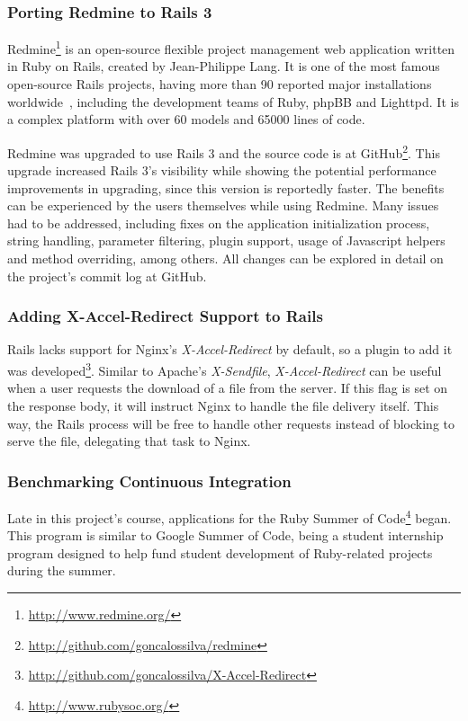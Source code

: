 \subsubsection{Porting Redmine to Rails 3}
Redmine\footnote{\url{http://www.redmine.org/}} is an open-source flexible project management web application written in Ruby on Rails, created by Jean-Philippe Lang. It is one of the most famous open-source Rails projects, having more than 90 reported major installations worldwide~\cite{redmine_installations}, including the development teams of Ruby, phpBB and Lighttpd. It is a complex platform with over 60 models and 65000 lines of code.

Redmine was upgraded to use Rails 3 and the source code is at GitHub\footnote{\url{http://github.com/goncalossilva/redmine}}. This upgrade increased Rails 3's visibility while showing the potential performance improvements in upgrading, since this version is reportedly faster. The benefits can be experienced by the users themselves while using Redmine. Many issues had to be addressed, including fixes on the application initialization process, string handling, parameter filtering, plugin support, usage of Javascript helpers and method overriding, among others. All changes can be explored in detail on the project's commit log at GitHub.


\subsubsection{Adding X-Accel-Redirect Support to Rails}
Rails lacks support for Nginx's \textit{X-Accel-Redirect} by default, so a plugin to add it was developed\footnote{\url{http://github.com/goncalossilva/X-Accel-Redirect}}. Similar to Apache's \textit{X-Sendfile}, \textit{X-Accel-Redirect} can be useful when a user requests the download of a file from the server. If this flag is set on the response body, it will instruct Nginx to handle the file delivery itself. This way, the Rails process will be free to handle other requests instead of blocking to serve the file, delegating that task to Nginx.


\subsubsection{Benchmarking Continuous Integration}
Late in this project's course, applications for the Ruby Summer of Code\footnote{\url{http://www.rubysoc.org/}} began. This program is similar to Google Summer of Code, being a student internship program designed to help fund student development of Ruby-related projects during the summer.

